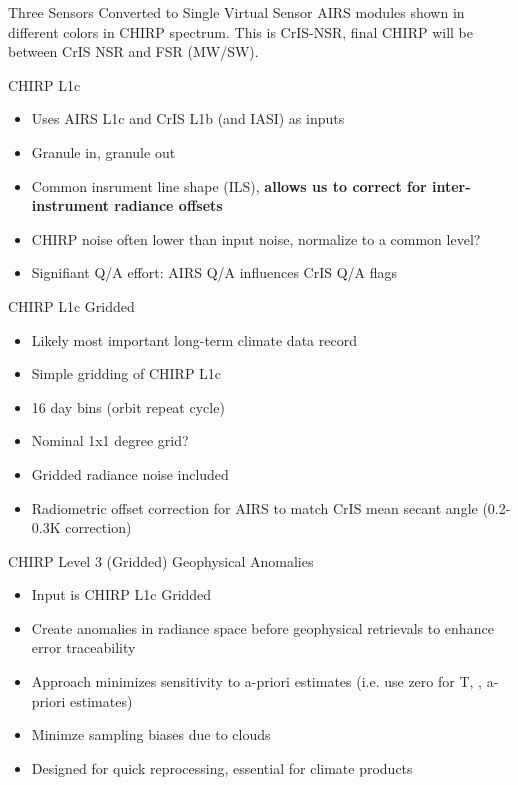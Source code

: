 \documentclass[10pt,t]{beamer}
\begin{document}
\begin{frame}[label={sec:org870ecd6}]{Three Sensors Converted to Single Virtual Sensor}
AIRS modules shown in different colors in CHIRP spectrum. This is CrIS-NSR, final CHIRP will be between CrIS NSR and FSR (MW/SW).
\end{frame}

\begin{frame}[label={sec:org4009e5f}]{CHIRP L1c}
\begin{itemize}
\item Uses AIRS L1c and CrIS L1b (and IASI) as inputs
\item Granule in, granule out
\item Common insrument line shape (ILS), \textbf{allows us to correct for inter-instrument radiance offsets}
\item CHIRP noise often lower than input noise, normalize to a common level?
\item Signifiant Q/A effort: AIRS Q/A influences CrIS Q/A flags
\end{itemize}
\end{frame}

\begin{frame}[label={sec:org4d0f3a3}]{CHIRP L1c Gridded}
\begin{itemize}
\item Likely most important long-term climate data record
\item Simple gridding of CHIRP L1c
\item 16 day bins (orbit repeat cycle)
\item Nominal 1x1 degree grid?
\item Gridded radiance noise included
\item Radiometric offset correction for AIRS to match CrIS mean secant angle (0.2-0.3K correction)
\end{itemize}
\end{frame}

\begin{frame}[label={sec:org552bf39}]{CHIRP Level 3 (Gridded) Geophysical Anomalies}
\begin{itemize}
\item Input is CHIRP L1c Gridded
\item Create anomalies in radiance space before geophysical retrievals to enhance error  traceability
\item Approach minimizes sensitivity to a-priori estimates (i.e. use zero for T, \water, \ozone a-priori estimates)
\item Minimze sampling biases due to clouds
\item Designed for quick reprocessing, essential for climate products
\end{itemize}
\end{frame}
\end{document}
